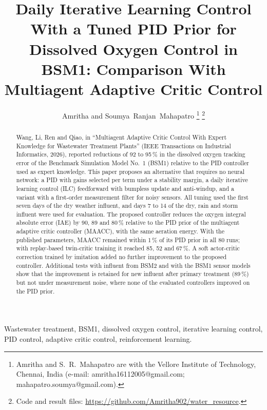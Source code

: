 \documentclass[journal]{IEEEtran}
\begin{document}
\title{Daily Iterative Learning Control With a Tuned PID Prior for Dissolved Oxygen Control in BSM1: Comparison With Multiagent Adaptive Critic Control}

\author{Amritha and Soumya~Ranjan~Mahapatro%
\thanks{Amritha and S.~R.~Mahapatro are with the Vellore Institute of Technology, Chennai, India (e-mail: amritha16112005@gmail.com; mahapatro.soumya@gmail.com).}%
\thanks{Code and result files: \url{https://github.com/Amritha902/water_resource}.}}


\maketitle

\begin{abstract}
Wang, Li, Ren and Qiao, in ``Multiagent Adaptive Critic Control With Expert
Knowledge for Wastewater Treatment Plants'' (IEEE Transactions on Industrial
Informatics, 2026), reported reductions of 92 to 95\,\% in the dissolved
oxygen tracking error of the Benchmark Simulation Model No.~1 (BSM1) relative
to the PID controller used as expert knowledge. This paper proposes an
alternative that requires no neural network: a PID with gains selected per
term under a stability margin, a daily iterative learning control (ILC)
feedforward with bumpless update and anti-windup, and a variant with a
first-order measurement filter for noisy sensors. All tuning used the first
seven days of the dry weather influent, and days 7 to 14 of the dry, rain
and storm influent were used for evaluation. The proposed controller reduces
the oxygen integral absolute error (IAE) by 90, 89 and 80\,\% relative to the
PID prior of the multiagent adaptive critic controller (MAACC), with the same
aeration energy. With the published parameters, MAACC remained within 1\,\%
of its PID prior in all 80 runs; with replay-based twin-critic training it
reached 85, 52 and 67\,\%. A soft actor-critic correction trained by
imitation added no further improvement to the proposed controller.
Additional tests with influent from BSM2 and with the BSM1 sensor models
show that the improvement is retained for new influent after primary
treatment (89\,\%) but not under measurement noise, where none of the evaluated controllers improved on
the PID prior.
\end{abstract}

\begin{IEEEkeywords}
Wastewater treatment, BSM1, dissolved oxygen control, iterative learning
control, PID control, adaptive critic control, reinforcement learning.
\end{IEEEkeywords}
\end{document}
